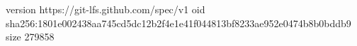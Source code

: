 version https://git-lfs.github.com/spec/v1
oid sha256:1801e002438aa745cd5dc12b2f4e1e41f044813bf8233ae952e0474b8b0bddb9
size 279858
